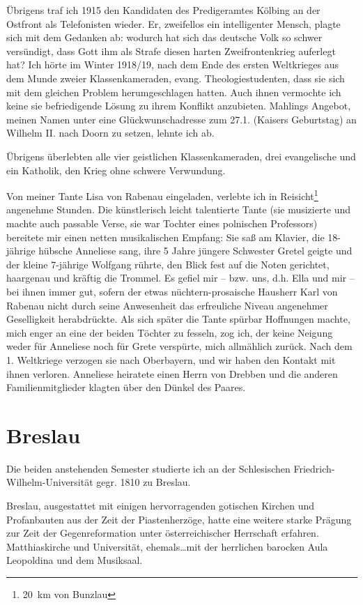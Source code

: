 \documentclass[a5paper,pagesize,10pt,twoside=true]{scrbook}
\renewcommand{\marginpar}[2][]{}
\begin{document}
Übrigens traf ich 1915 den Kandidaten des Predigeramtes Kölbing an der Ostfront als Telefonisten wieder. Er, zweifellos ein intelligenter Mensch, plagte sich mit dem Gedanken ab: wodurch hat sich das deutsche Volk so schwer versündigt, dass Gott ihm als Strafe diesen harten Zweifrontenkrieg auferlegt hat? Ich hörte im Winter 1918/19, nach dem Ende des ersten Weltkrieges aus dem Munde zweier Klassenkameraden, evang. Theologiestudenten, dass sie sich mit dem gleichen Problem herumgeschlagen hatten. Auch ihnen vermochte ich keine sie befriedigende Lösung zu ihrem Konflikt anzubieten. Mahlings Angebot, meinen Namen unter eine Glückwunschadresse zum 27.1. (Kaisers Geburtstag) an Wilhelm II. nach Doorn zu setzen, lehnte ich ab.

Übrigens überlebten alle vier geistlichen Klassenkameraden, drei evangelische und ein Katholik, den Krieg ohne schwere Verwundung.

Von meiner Tante Lisa von Rabenau eingeladen, verlebte ich in Reisicht\footnote{20~km von Bunzlau} angenehme Stunden. Die künstlerisch leicht talentierte Tante (sie musizierte und machte auch passable Verse, sie war Tochter eines polnischen Professors) bereitete mir einen netten musikalischen Empfang: Sie saß am Klavier, die 18-jährige hübsche Anneliese sang, ihre 5 Jahre jüngere Schwester Gretel geigte und der kleine 7-jährige Wolfgang rührte, den Blick fest auf die Noten gerichtet, haargenau und kräftig die Trommel. Es gefiel mir -- bzw. uns, d.h. Ella und mir -- bei ihnen immer gut, sofern der etwas nüchtern-prosaische Hausherr Karl von Rabenau nicht durch seine Anwesenheit das erfreuliche Niveau angenehmer Geselligkeit herabdrückte. Als sich später die Tante spürbar Hoffnungen machte, mich enger an eine der beiden Töchter zu fesseln, zog ich, der keine Neigung weder für Anneliese noch für Grete verspürte, \marginpar{149}mich allmählich zurück. Nach dem 1. Weltkriege verzogen sie nach Oberbayern, und wir haben den Kontakt mit ihnen verloren. Anneliese heiratete einen Herrn von Drebben und die anderen Familienmitglieder klagten über den Dünkel des Paares.


\section{Breslau}

Die beiden anstehenden Semester studierte ich an der Schlesischen Friedrich-Wilhelm-Universität gegr. 1810 zu Breslau.

Breslau, ausgestattet mit einigen hervorragenden gotischen Kirchen und Profanbauten aus der Zeit der Piastenherzöge, hatte eine weitere starke Prägung zur Zeit der Gegenreformation unter österreichischer Herrschaft erfahren. Matthiaskirche und Universität, ehemals\dots mit der herrlichen barocken Aula Leopoldina und dem Musiksaal.
\end{document}
